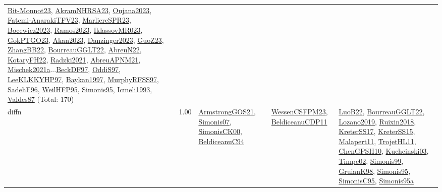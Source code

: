 {\begin{longtable}{p{3cm}r>{\raggedright\arraybackslash}p{6cm}>{\raggedright\arraybackslash}p{6cm}>{\raggedright\arraybackslash}p{8cm}}
\hyperref[detail:Bit-Monnot23]{Bit-Monnot23}, \hyperref[detail:AkramNHRSA23]{AkramNHRSA23}, \hyperref[detail:Oujana2023]{Oujana2023}, \hyperref[detail:Fatemi-AnarakiTFV23]{Fatemi-AnarakiTFV23}, \hyperref[detail:MarliereSPR23]{MarliereSPR23}, \hyperref[detail:Bocewicz2023]{Bocewicz2023}, \hyperref[detail:Ramos2023]{Ramos2023}, \hyperref[detail:IklassovMR023]{IklassovMR023}, \hyperref[detail:GokPTGO23]{GokPTGO23}, \hyperref[detail:Akan2023]{Akan2023}, \hyperref[detail:Danzinger2023]{Danzinger2023}, \hyperref[detail:GuoZ23]{GuoZ23}, \hyperref[detail:ZhangBB22]{ZhangBB22}, \hyperref[detail:BourreauGGLT22]{BourreauGGLT22}, \hyperref[detail:AbreuN22]{AbreuN22}, \hyperref[detail:KotaryFH22]{KotaryFH22}, \hyperref[detail:Radzki2021]{Radzki2021}, \hyperref[detail:AbreuAPNM21]{AbreuAPNM21}, \hyperref[detail:Mischek2021a]{Mischek2021a}...\hyperref[detail:BeckDF97]{BeckDF97}, \hyperref[detail:OddiS97]{OddiS97}, \hyperref[detail:LeeKLKKYHP97]{LeeKLKKYHP97}, \hyperref[detail:Baykan1997]{Baykan1997}, \hyperref[detail:MurphyRFSS97]{MurphyRFSS97}, \hyperref[detail:SadehF96]{SadehF96}, \hyperref[detail:WeilHFP95]{WeilHFP95}, \hyperref[detail:Simonis95]{Simonis95}, \hyperref[detail:Icmeli1993]{Icmeli1993}, \hyperref[detail:Valdes87]{Valdes87} (Total: 170)\\
\index{diffn}\index{Constraints!diffn}diffn &  1.00 & \hyperref[detail:ArmstrongGOS21]{ArmstrongGOS21}, \hyperref[detail:Simonis07]{Simonis07}, \hyperref[detail:SimonisCK00]{SimonisCK00}, \hyperref[detail:BeldiceanuC94]{BeldiceanuC94} & \hyperref[detail:WessenCSFPM23]{WessenCSFPM23}, \hyperref[detail:BeldiceanuCDP11]{BeldiceanuCDP11} & \hyperref[detail:LuoB22]{LuoB22}, \hyperref[detail:BourreauGGLT22]{BourreauGGLT22}, \hyperref[detail:Lozano2019]{Lozano2019}, \hyperref[detail:Ruixin2018]{Ruixin2018}, \hyperref[detail:KreterSS17]{KreterSS17}, \hyperref[detail:KreterSS15]{KreterSS15}, \hyperref[detail:Malapert11]{Malapert11}, \hyperref[detail:TrojetHL11]{TrojetHL11}, \hyperref[detail:ChenGPSH10]{ChenGPSH10}, \hyperref[detail:Kuchcinski03]{Kuchcinski03}, \hyperref[detail:Timpe02]{Timpe02}, \hyperref[detail:Simonis99]{Simonis99}, \hyperref[detail:GruianK98]{GruianK98}, \hyperref[detail:Simonis95]{Simonis95}, \hyperref[detail:SimonisC95]{SimonisC95}, \hyperref[detail:Simonis95a]{Simonis95a}\\

\end{longtable}}
